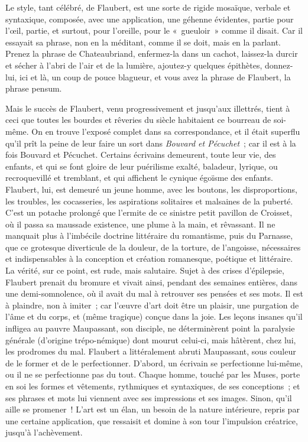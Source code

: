 \documentclass[french,twoside]{book} %
\begin{document}
Le style, tant célébré, de Flaubert, est une sorte de rigide mosaïque, verbale et syntaxique, composée, avec une application, une géhenne évidentes, partie pour l’œil, partie, et surtout, pour l’oreille, pour le « gueuloir » comme il disait. Car il essayait sa phrase, non en la méditant, comme il se doit, mais en la parlant. Prenez la phrase de Chateaubriand, enfermez-la dans un cachot, laissez-la durcir et sécher à l’abri de l’air et de la lumière, ajoutez-y quelques épithètes, donnez-lui, ici et là, un coup de pouce blagueur, et vous avez la phrase de Flaubert, la phrase pensum.\par
Mais le succès de Flaubert, venu progressivement et jusqu’aux illettrés, tient à ceci que toutes les bourdes et rêveries du siècle habitaient ce bourreau de soi-même. On en trouve l’exposé complet dans sa correspondance, et il était superflu qu’il prît la peine de leur faire un sort dans {\itshape Bouvard et Pécuchet} ; car il est à la fois Bouvard et Pécuchet. Certains écrivains demeurent, toute leur vie, des enfants, et qui se font gloire de leur puérilisme exalté, baladeur, lyrique, ou recroquevillé et tremblant, et qui affichent le cynique égoïsme des enfants. Flaubert, lui, est demeuré un jeune homme, avec les boutons, les disproportions, les troubles, les cocasseries, les aspirations solitaires et malsaines de la puberté. C’est un potache prolongé que l’ermite de ce sinistre petit pavillon de Croisset, où il passa sa maussade existence, une plume à la main, et rêvassant. Il ne manquait plus à l’imbécile doctrine littéraire du romantisme, puis du Parnasse, que ce grotesque diverticule de la douleur, de la torture, de l’angoisse, nécessaires et indispensables à la conception et création romanesque, poétique et littéraire. La vérité, sur ce point, est rude, mais salutaire. Sujet à des crises d’épilepsie, Flaubert prenait du bromure et vivait ainsi, pendant des semaines entières, dans une demi-somnolence, où il avait du mal à retrouver ses pensées et ses mots. Il est à plaindre, non à imiter ; car l’œuvre d’art doit être un plaisir, une purgation de l’âme et du corps, et (même tragique) conçue dans la joie. Les leçons insanes qu’il infligea au pauvre Maupassant, son disciple, ne déterminèrent point la paralysie générale (d’origine trépo-némique) dont mourut celui-ci, mais hâtèrent, chez lui, les prodromes du mal. Flaubert a littéralement abruti Maupassant, sous couleur de le former et de le perfectionner. D’abord, un écrivain se perfectionne lui-même, ou il ne se perfectionne pas du tout. Chaque homme, touché par les Muses, porte en soi les formes et vêtements, rythmiques et syntaxiques, de ses conceptions ; et ses phrases et mots lui viennent avec ses impressions et ses images. Sinon, qu’il aille se promener ! L’art est un élan, un besoin de la nature intérieure, repris par une certaine application, que ressaisit et domine à son tour l’impulsion créatrice, jusqu’à l’achèvement.\par
\end{document}

